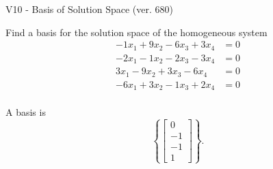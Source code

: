 \begin{exercise}
  \begin{exerciseTitle}V10 - Basis of Solution Space (ver. 680)\end{exerciseTitle}
  \begin{exerciseStatement}
    Find a basis for the solution space of the homogeneous system 
\begin{align*}
 -1 x_ 1 + 9 x_ 2 -6 x_ 3 + 3 x_ 4 &= 0  \\ 
  -2 x_ 1 -1 x_ 2 -2 x_ 3 -3 x_ 4 &= 0  \\ 
  3 x_ 1 -9 x_ 2 + 3 x_ 3 -6 x_ 4 &= 0  \\ 
  -6 x_ 1 + 3 x_ 2 -1 x_ 3 + 2 x_ 4 &= 0  \\ 
 \end{align*}


 
  \end{exerciseStatement}

  \begin{exerciseAnswer}
   A basis is   
\[\left\{\left[\begin{array}{c}
0 \\
-1 \\
-1 \\
1
\end{array}\right]\right\}.\]

  


  \end{exerciseAnswer}
\end{exercise}